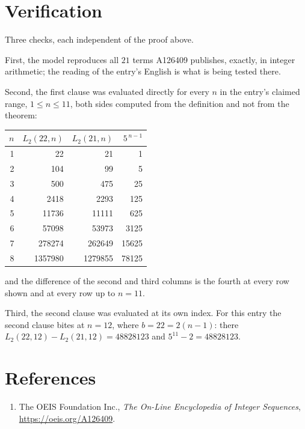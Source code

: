 \documentclass[11pt,a4paper]{article}
\theoremstyle{plain}
\theoremstyle{definition}
\begin{document}
\section{Verification}

Three checks, each independent of the proof above.

First, the model reproduces all $21$ terms A126409 publishes, exactly, in integer
arithmetic; the reading of the entry's English is what is being tested there.

Second, the first clause was evaluated directly for every $n$ in the entry's claimed range,
$1\le n\le11$, both sides computed from the definition and not from the theorem:

\begin{center}
\begin{tabular}{rrrr}
$n$ & $L_{2}(22,n)$ & $L_{2}(21,n)$ & $5^{\,n-1}$ \\ \hline
1 & 22 & 21 & 1 \\
2 & 104 & 99 & 5 \\
3 & 500 & 475 & 25 \\
4 & 2418 & 2293 & 125 \\
5 & 11736 & 11111 & 625 \\
6 & 57098 & 53973 & 3125 \\
7 & 278274 & 262649 & 15625 \\
8 & 1357980 & 1279855 & 78125 \\
\end{tabular}
\end{center}

\noindent and the difference of the second and third columns is the fourth at every row shown
and at every row up to $n=11$.

Third, the second clause was evaluated at its own index. For this entry the second clause bites at $n=12$, where $b=22=2(n-1)$: there $L_{2}(22,12)-L_{2}(21,12)=48828123$ and $5^{11}-2=48828123$.

\section*{References}
\begin{enumerate}
\item The OEIS Foundation Inc., \emph{The On-Line Encyclopedia of Integer Sequences},
\url{https://oeis.org/A126409}.
\end{enumerate}
\end{document}
